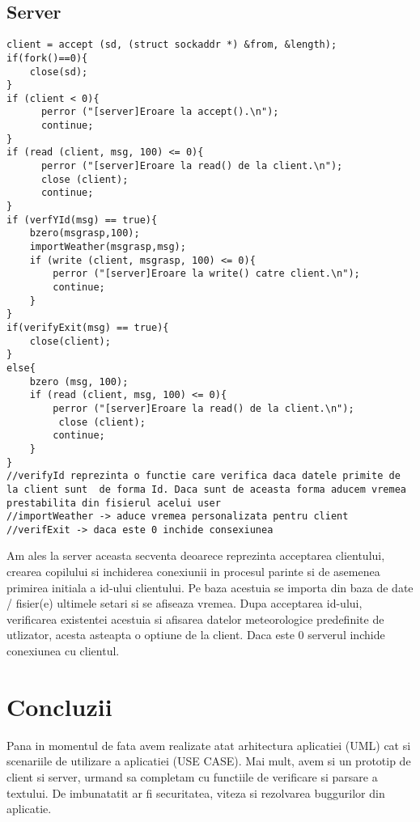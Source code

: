\documentclass{llncs}
\begin{document}
\subsection{Server}
%
\begin{lstlisting}
client = accept (sd, (struct sockaddr *) &from, &length);
if(fork()==0){
	close(sd);
}
if (client < 0){
	  perror ("[server]Eroare la accept().\n");
	  continue;
}
if (read (client, msg, 100) <= 0){
	  perror ("[server]Eroare la read() de la client.\n");
	  close (client);	
	  continue;		
}
if (verfYId(msg) == true){
	bzero(msgrasp,100);
	importWeather(msgrasp,msg);
	if (write (client, msgrasp, 100) <= 0){
	 	perror ("[server]Eroare la write() catre client.\n");
	  	continue;		
	}
}
if(verifyExit(msg) == true){
	close(client);
}
else{
	bzero (msg, 100);
	if (read (client, msg, 100) <= 0){
	  	perror ("[server]Eroare la read() de la client.\n");
	 	 close (client);	
	  	continue;		
	}
}
//verifyId reprezinta o functie care verifica daca datele primite de la client sunt  de forma Id. Daca sunt de aceasta forma aducem vremea prestabilita din fisierul acelui user
//importWeather -> aduce vremea personalizata pentru client
//verifExit -> daca este 0 inchide consexiunea
\end{lstlisting}
%
Am ales la server aceasta secventa deoarece reprezinta acceptarea clientului, crearea copilului si inchiderea conexiunii in procesul parinte si de asemenea
primirea initiala a id-ului clientului. Pe baza acestuia se importa din baza de date / fisier(e) ultimele setari si se afiseaza vremea. Dupa acceptarea id-ului, verificarea existentei
acestuia si afisarea datelor meteorologice predefinite de utlizator, acesta asteapta o optiune de la client. Daca este 0 serverul inchide conexiunea cu clientul.
%
\section{Concluzii}
%
Pana in momentul de fata avem realizate atat arhitectura aplicatiei (UML) cat si scenariile de utilizare a aplicatiei (USE CASE). Mai mult, avem si un prototip de client si server, urmand sa completam cu functiile de verificare si parsare a textului. De imbunatatit ar fi securitatea, viteza si rezolvarea buggurilor din aplicatie.
%
\end{document}
